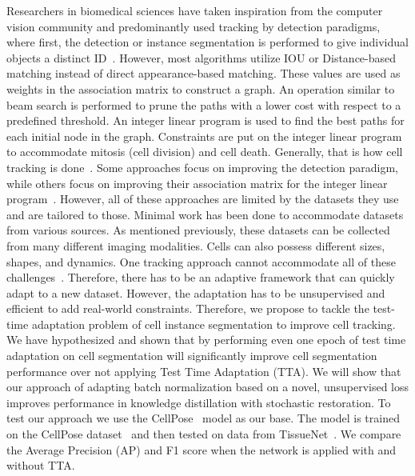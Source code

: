 Researchers in biomedical sciences have taken inspiration from the computer vision community and predominantly used tracking by detection paradigms, where first, the detection or instance segmentation is performed to give individual objects a distinct ID~\cite{bragantini2024ultrack,ershov2022trackmate}. However, most algorithms utilize IOU or Distance-based matching instead of direct appearance-based matching. These values are used as weights in the association matrix to construct a graph. An operation similar to beam search is performed to prune the paths with a lower cost with respect to a predefined threshold.  An integer linear program is used to find the best paths for each initial node in the graph. Constraints are put on the integer linear program to accommodate mitosis (cell division) and cell death. Generally, that is how cell tracking is done~\cite{mavska2023cell}. Some approaches focus on improving the detection paradigm, while others focus on improving their association matrix for the integer linear program~\cite{mavska2023cell}. However, all of these approaches are limited by the datasets they use and are tailored to those. Minimal work has been done to accommodate datasets from various sources. As mentioned previously, these datasets can be collected from many different imaging modalities. Cells can also possess different sizes, shapes, and dynamics. One tracking approach cannot accommodate all of these challenges~\cite{chen2024cmtt}. Therefore, there has to be an adaptive framework that can quickly adapt to a new dataset. However, the adaptation has to be unsupervised and efficient to add real-world constraints. Therefore, we propose to tackle the test-time adaptation problem of cell instance segmentation to improve cell tracking.\\

We have hypothesized and shown that by performing even one epoch of test time adaptation on cell segmentation will significantly improve cell segmentation performance over not applying Test Time Adaptation (TTA). We will show that our approach of adapting batch normalization based on a novel, unsupervised loss improves performance in knowledge distillation with stochastic restoration. To test our approach we use the CellPose~\cite{keaton2023celltranspose} model as our base. The model is trained on the CellPose dataset~\cite{stringer2021cellpose} and then tested on data from TissueNet~\cite{TissueNet,TN2,TN3,TN4}. We compare the Average Precision (AP) and F1 score when the network is applied with and without TTA. 


